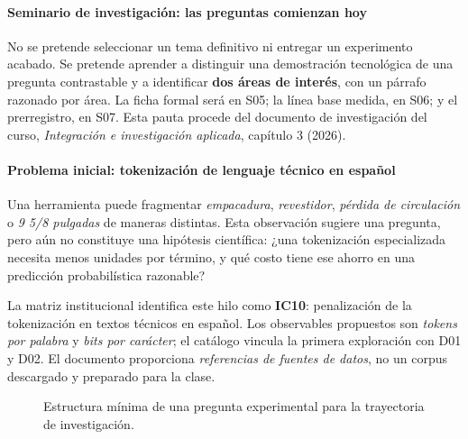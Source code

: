 \paragraph{Seminario de investigación: las preguntas comienzan hoy}

\begin{investigacion}
No se pretende seleccionar un tema definitivo ni entregar un experimento acabado.
Se pretende aprender a distinguir una demostración tecnológica de una pregunta
contrastable y a identificar \textbf{dos áreas de interés}, con un párrafo razonado
por área. La ficha formal será en S05; la línea base medida, en S06; y el
prerregistro, en S07. Esta pauta procede del documento de investigación del curso,
\emph{Integración e investigación aplicada}, capítulo 3 (2026).
\end{investigacion}

\paragraph{Problema inicial: tokenización de lenguaje técnico en español}

Una herramienta puede fragmentar \emph{empacadura}, \emph{revestidor},
\emph{pérdida de circulación} o \emph{9 5/8 pulgadas} de maneras distintas.
Esta observación sugiere una pregunta, pero aún no constituye una hipótesis
científica: ¿una tokenización especializada necesita menos unidades por término,
y qué costo tiene ese ahorro en una predicción probabilística razonable?

La matriz institucional identifica este hilo como \textbf{IC10}: penalización de
la tokenización en textos técnicos en español. Los observables propuestos son
\emph{tokens por palabra} y \emph{bits por carácter}; el catálogo vincula la
primera exploración con D01 y D02. El documento proporciona \emph{referencias de
fuentes de datos}, no un corpus descargado y preparado para la clase.

\begin{figure}[H]\centering
{}
\caption{Estructura mínima de una pregunta experimental para la trayectoria de investigación.}
\end{figure}

